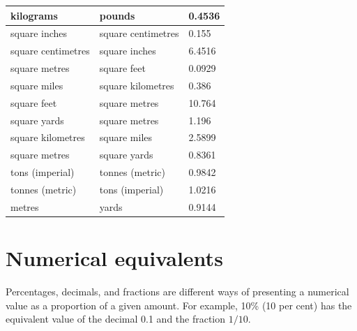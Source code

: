 \documentclass[10pt]{article}
\begin{document}
\begin{center}
\begin{tabular}{|l|l|l|}
kilograms & pounds & 0.4536 \\
\hline
square inches & square centimetres & 0.155 \\
\hline
square centimetres & square inches & 6.4516 \\
\hline
square metres & square feet & 0.0929 \\
\hline
square miles & square kilometres & 0.386 \\
\hline
square feet & square metres & 10.764 \\
\hline
square yards & square metres & 1.196 \\
\hline
square kilometres & square miles & 2.5899 \\
\hline
square metres & square yards & 0.8361 \\
\hline
tons (imperial) & tonnes (metric) & 0.9842 \\
\hline
tonnes (metric) & tons (imperial) & 1.0216 \\
\hline
metres & yards & 0.9144 \\
\hline
\end{tabular}
\end{center}

\section*{Numerical equivalents}
Percentages, decimals, and fractions are different ways of presenting a numerical value as a proportion of a given amount. For example, 10\% (10 per cent) has the equivalent value of the decimal 0.1 and the fraction $1 / 10$.
\end{document}
